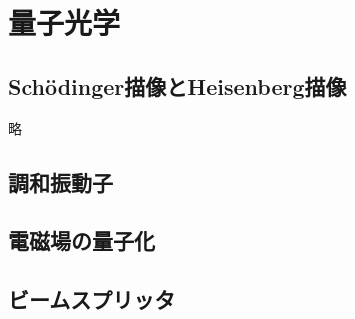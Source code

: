 \documentclass{report}
\begin{document}
  \maketitle
  \chapter{量子光学}
    \section{Sch\"odinger描像とHeisenberg描像}
      略
    \section{調和振動子}
      
    \section{電磁場の量子化}
      
    \section{ビームスプリッタ}
      
\end{document}
